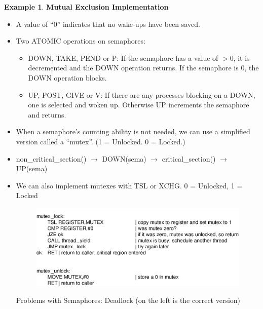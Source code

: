 \documentclass[12pt,a4paper]{article}
\theoremstyle{definition}
\newtheorem{example}{Example}[section]
\newenvironment{myitemize}
{ \begin{itemize}
    \setlength{\itemsep}{5pt}
    \setlength{\parskip}{0pt}
    \setlength{\parsep}{0pt}     }
{ \end{itemize}                  }
\begin{document}
\begin{example}{\textbf{Mutual Exclusion Implementation}}
\begin{myitemize}
		\begin{myitemize}
			\item  A value of “0” indicates that no wake-ups have been saved.
			\item Two ATOMIC operations on semaphores:
			\begin{myitemize}
				\item DOWN, TAKE, PEND or P: If the semaphore has a value of $>0$, it is decremented and the DOWN operation returns. If the semaphore is 0, the DOWN operation blocks.
				\item UP, POST, GIVE or V: If there are any processes blocking on a DOWN, one is selected and woken up. Otherwise UP increments the semaphore and returns.
			\end{myitemize}
			\item When a semaphore’s counting ability is not needed, we can use a simplified version called a “mutex”. (1 = Unlocked. 0 = Locked.)
			\item non\_critical\_section() $\rightarrow$ DOWN(sema) $\rightarrow$ critical\_section() $\rightarrow$ UP(sema)
			\item We can also implement mutexes with \textsf{TSL} or \textsf{XCHG}. 0 = Unlocked, 1 = Locked
			\begin{figure}[!h]
				\includegraphics[scale=0.4]{m1/mutexWithTSL}
				\centering
			\end{figure}
			\begin{tcolorbox}
				\textsf{Problems with Semaphores: Deadlock} (on the left is the correct version)
				

\end{tcolorbox}
\end{myitemize}
\end{myitemize}
\end{example}
\end{document}
